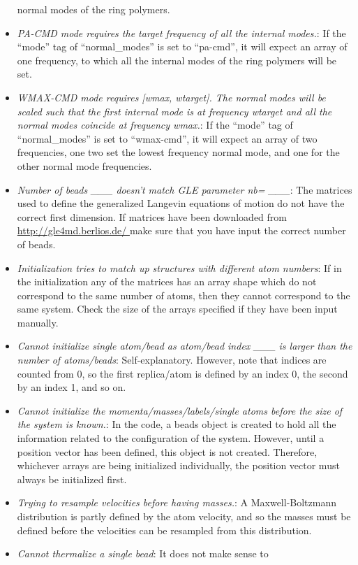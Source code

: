 \documentclass[11pt,english,fleqn]{report}
\begin{document}
\begin{itemize}
normal modes of the ring polymers. 
\item \emph{PA-CMD mode requires the target frequency of all the internal modes.}:
If the {}``mode'' tag of {}``normal\_modes'' is set to {}``pa-cmd'',
it will expect an array of one frequency, to which all the internal
modes of the ring polymers will be set. 
\item \emph{WMAX-CMD mode requires [wmax, wtarget]. The normal modes will be scaled such that the first internal mode is at frequency wtarget and all the normal modes coincide at frequency wmax.}:
If the {}``mode'' tag of {}``normal\_modes'' is set to {}``wmax-cmd'',
it will expect an array of two frequencies, one two set the lowest
frequency normal mode, and one for the other normal mode frequencies.
\item \emph{Number of beads \_\_\_ doesn't match GLE parameter nb= \_\_\_}:
The matrices used to define the generalized Langevin equations of
motion do not have the correct first dimension. If matrices have been
downloaded from \url{http://gle4md.berlios.de/ } make sure that you
have input the correct number of beads.
\item \emph{Initialization tries to match up structures with different atom numbers}:
If in the initialization any of the matrices has an array shape which
do not correspond to the same number of atoms, then they cannot correspond
to the same system. Check the size of the arrays specified if they
have been input manually.
\item \emph{Cannot initialize single atom/bead as atom/bead index \_\_\_ is larger than the number of atoms/beads}:
Self-explanatory. However, note that indices are counted from 0, so
the first replica/atom is defined by an index 0, the second by an
index 1, and so on.
\item \emph{Cannot initialize the momenta/masses/labels/single atoms before the size of the system is known.}:
In the code, a beads object is created to hold all the information
related to the configuration of the system. However, until a position
vector has been defined, this object is not created. Therefore, whichever
arrays are being initialized individually, the position vector must
always be initialized first.
\item \emph{Trying to resample velocities before having masses.}: A Maxwell-Boltzmann
distribution is partly defined by the atom velocity, and so the masses
must be defined before the velocities can be resampled from this distribution.
\item \emph{Cannot thermalize a single bead}: It does not make sense to

\end{itemize}
\end{document}
